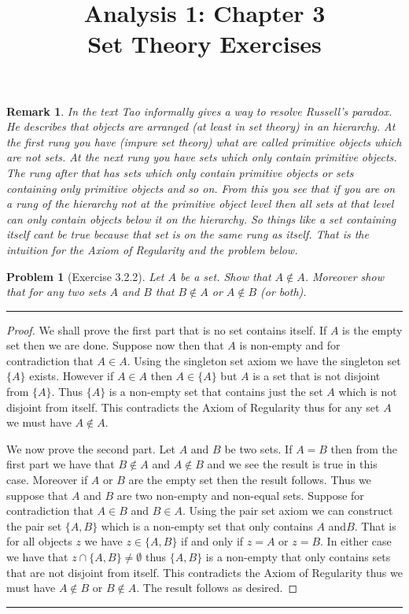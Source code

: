 \documentclass{article}
\title{\huge Analysis 1: Chapter 3 \\ \LARGE {Set Theory Exercises}}
\date{}
\newcommand{\lined}{\noindent\rule{\textwidth}{1pt}}
\newtheorem*{problem}{Problem}
\newtheorem*{remark}{Remark}
\begin{document}
	\maketitle
	
	\begin{remark}
		In the text Tao informally gives a way to resolve Russell's paradox. He describes that objects are arranged (at least in set theory)
		in an hierarchy. At the first rung you have (impure set theory) what are called primitive objects which are not sets. At the next 
		rung you have sets which only contain primitive objects. The rung after that has sets which only contain primitive objects or sets containing only primitive objects and so on. From this you see that if you are on a rung of the hierarchy not at the primitive object level then all sets at that level can only contain objects below it on the hierarchy. So things like a set containing itself
		cant be true because that set is on the same rung as itself. That is the intuition for the Axiom of Regularity and the problem below.
	\end{remark}
	
	\begin{problem}[Exercise 3.2.2]
		Let $A$ be a set. Show that $A \notin A$. Moreover show that for any two sets $A$ and $B$ that $B \notin A$ or $A \notin B$ (or both).
	\end{problem}

	\lined
	\begin{proof}
		We shall prove the first part that is no set contains itself. If $A$ is the empty set then we are done. Suppose now then that $A$
		is non-empty and for contradiction that $A \in A$. Using the singleton set axiom we have the singleton set $\{A\}$ exists. However if $A \in A$ then $A \in \{A\}$ but $A$ is a set that is not disjoint from $\{A\}$. Thus $\{A\}$ is a non-empty set that
		contains just the set $A$ which is not disjoint from itself. This contradicts the Axiom of Regularity thus for any set $A$ we must have $A \notin A$.
		\linebreak
		
		\noindent We now prove the second part. Let $A$ and $B$ be two sets. If $A = B$ then from the first part we have that
		 $B \notin A$ and $A \notin B$ and we see the result is true in this case. Moreover if $A$ or $B$ are the empty set then the result follows. Thus we suppose that $A$ and $B$ are two non-empty and non-equal sets. Suppose for contradiction that 
		 $A \in B$ and $B \in A$. Using the pair set axiom we can construct the pair set $\{A,B\}$ which is a non-empty set that only contains $A$ and$B$. That is for all objects $z$ we have $z \in \{A,B\}$ if and only if $z = A$ or $z = B$. In either case we have that $z \cap \{A,B\} \neq \emptyset$ thus $\{A,B\}$ is a non-empty that only contains sets that are not disjoint from itself. This contradicts the Axiom of Regularity thus we must have $A \notin B$ or $B \notin A$. The result follows as desired.
	\end{proof}
	\lined
	
\end{document}
